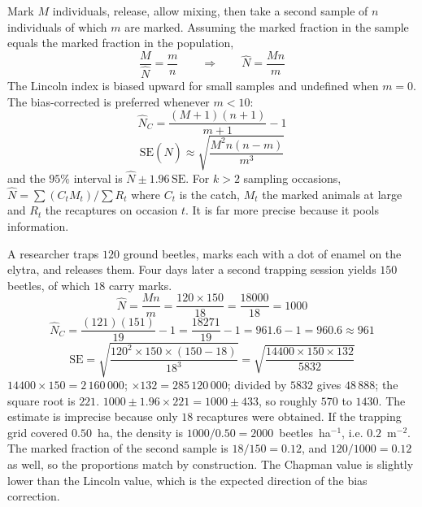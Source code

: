 \begin{keybox}[title={MEMORIZE: the Lincoln-Petersen index and its relatives}]
Mark $M$ individuals, release, allow mixing, then take a second sample of $n$
individuals of which $m$ are marked. Assuming the marked fraction in the sample
equals the marked fraction in the population,
\[
\frac{M}{\hat{N}}=\frac{m}{n}\qquad\Longrightarrow\qquad
\hat{N}=\frac{Mn}{m}
\]
The Lincoln index is biased upward for small samples and undefined when $m=0$.
The bias-corrected  is preferred whenever $m<10$:
\[
\hat{N}_{C}=\frac{(M+1)(n+1)}{m+1}-1
\]
\[
\mathrm{SE}(\hat{N})\approx\sqrt{\frac{M^2 n (n-m)}{m^3}}
\]
and the $95\%$ interval is $\hat{N}\pm 1.96\,\mathrm{SE}$.
For $k>2$ sampling occasions,
$\hat{N}=\sum(C_t M_t)/\sum R_t$ where $C_t$ is the catch, $M_t$ the marked
animals at large and $R_t$ the recaptures on occasion $t$. It is far more precise
because it pools information.
\end{keybox}

\begin{calcbox}[title={WORKED: mark-recapture of a beetle population}]
A researcher traps $120$ ground beetles, marks each with a dot of enamel on the
elytra, and releases them. Four days later a second trapping session yields $150$
beetles, of which $18$ carry marks.
\[
\hat{N}=\frac{Mn}{m}=\frac{120\times 150}{18}=\frac{18000}{18}=1000
\]
\[
\hat{N}_C=\frac{(121)(151)}{19}-1=\frac{18271}{19}-1=961.6-1=960.6\approx 961
\]
\[
\mathrm{SE}=\sqrt{\frac{120^2\times 150\times(150-18)}{18^3}}
=\sqrt{\frac{14400\times150\times132}{5832}}
\]
$14400\times150=2\,160\,000$; $\times 132=285\,120\,000$; divided by $5832$ gives
$48\,888$; the square root is $221$.
 $1000\pm 1.96\times 221 = 1000\pm 433$, so roughly
$570$ to $1430$. The estimate is imprecise because only $18$ recaptures were
obtained.
 If the trapping grid covered $0.50$~ha, the density is
$1000/0.50=2000$~beetles~ha$^{-1}$, i.e. $0.2$~m$^{-2}$.
 The marked fraction of the second sample is
$18/150=0.12$, and $120/1000=0.12$ as well, so the proportions match by
construction. The Chapman value is slightly lower than the Lincoln value, which
is the expected direction of the bias correction. \tm{$\surd$}
\end{calcbox}

